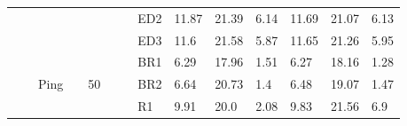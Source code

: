 {\begin{minipage}{\linewidth}
\begin{tabular}{l|l|l|l|c|c|r|l|lll|lll}
                                              &                                          &                                           &                                           &                                            &                                                                                         & \multicolumn{1}{c|}{}                                                                          & ED2                                       & 11.87 & 21.39 & 6.14      & 11.69 & 21.07 & 6.13       \\
                                              &                                          &                                           &                                           &                                            &                                                                                         & \multicolumn{1}{c|}{}                                                                          & ED3                                       & 11.6  & 21.58 & 5.87      & 11.65 & 21.26 & 5.95       \\
  \cline{3-3}\cline{5-5}\cline{8-14}
                                              &                                          & \multirow{8}{*}{Ping}                     &                                           & \multirow{8}{*}{50}                        &                                                                                         & \multicolumn{1}{c|}{}                                                                          & BR1                                       & 6.29  & 17.96 & 1.51      & 6.27  & 18.16 & 1.28       \\
                                              &                                          &                                           &                                           &                                            &                                                                                         & \multicolumn{1}{c|}{}                                                                          & BR2                                       & 6.64  & 20.73 & 1.4       & 6.48  & 19.07 & 1.47       \\
                                              &                                          &                                           &                                           &                                            &                                                                                         & \multicolumn{1}{c|}{}                                                                          & R1                                        & 9.91  & 20.0  & 2.08      & 9.83  & 21.56 & 6.9        \\

\end{tabular}
\end{minipage}}
